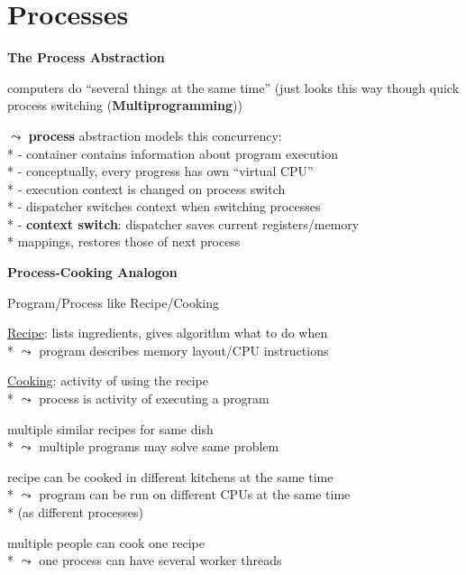 \section{Processes}

\textbf{The Process Abstraction}
\begin{items}
	\item computers do "`several things at the same time"' (just looks this way though quick process switching (\textbf{Multiprogramming}))
	\item \( \leadsto \) \textbf{process} abstraction models this concurrency: \\*
		- container contains information about program execution \\*
		- conceptually, every progress has own "`virtual CPU"' \\*
		- execution context is changed on process switch \\*
		- dispatcher switches context when switching processes \\*
		- \textbf{context switch}: dispatcher saves current registers/memory \\* \phantom{-} mappings, restores those of next process
\end{items}

\textbf{Process-Cooking Analogon}
\begin{items}
	\item Program/Process like Recipe/Cooking
	\item \underline{Recipe}: lists ingredients, gives algorithm what to do when \\*
		\( \leadsto \) program describes memory layout/CPU instructions
	\item \underline{Cooking}: activity of using the recipe \\*
		\( \leadsto \) process is activity of executing a program
	\item multiple similar recipes for same dish \\*
		\( \leadsto \) multiple programs may solve same problem
	\item recipe can be cooked in different kitchens at the same time \\*
		\( \leadsto \) program can be run on different CPUs at the same time \\* \phantom{\( \leadsto \)} (as different processes)
	\item multiple people can cook one recipe \\*
		\( \leadsto \) one process can have several worker threads
\end{items}

